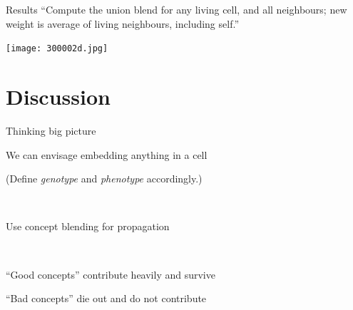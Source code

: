 \begin{frame}{Results}{}
{\footnotesize ``Compute the union blend for any living cell, and all neighbours; new weight is average of living neighbours, including self.''}
\begin{center}
\texttt{[image: 300002d.jpg]}
\end{center}
\end{frame}

\part{Discussion}
\frame{\partpage}

\begin{frame}{Thinking big picture}{}
\begin{center}
\item{We can envisage embedding anything in a cell}
\item{(Define \emph{genotype} and \emph{phenotype} accordingly.)}
\item{~}
\item{Use concept blending for propagation}
\item{~}
\item{``Good concepts'' contribute heavily and survive}
\item{``Bad concepts'' die out and do not contribute}
\end{center}
\end{frame}


